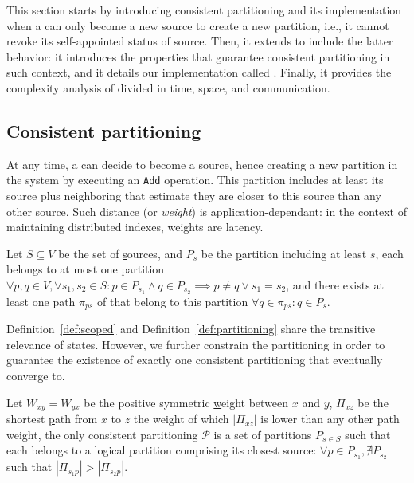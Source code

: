 \noindent This section starts by introducing consistent partitioning
and its implementation when a \process can only become a new source to
create a new partition, i.e., it cannot revoke its self-appointed
status of source. Then, it extends to include the latter behavior: it
introduces the properties that guarantee consistent partitioning in
such context, and it details our implementation called \NAME. Finally,
it provides the complexity analysis of \NAME divided in time, space,
and communication.


\subsection{Consistent partitioning}

At any time, a \process can decide to become a source, hence creating a
new partition in the system by executing an \texttt{Add}
operation. This partition includes at least its source plus
neighboring \processes that estimate they are closer to this source
than any other source. Such distance (or \emph{weight}) is
application-dependant: in the context of maintaining distributed
indexes, weights are latency.


\begin{definition}
  Let $S \subseteq V$ be the set of \underline{s}ources, and $P_s$ be
  the \underline{p}artition including at least \Process $s$, each
  \process belongs to at most one partition $\forall p,q \in V, \forall
  s_1,s_2 \in S: p \in P_{s_1} \wedge q \in P_{s_2} \implies p \neq q
  \vee s_1 = s_2$, and there exists at least one path $\pi_{ps}$ of
  \processes that belong to this partition $\forall q \in \pi_{ps}: q
  \in P_s$.
\end{definition}

Definition~\ref{def:scoped} and Definition~\ref{def:partitioning}
share the transitive relevance of \process states. However, we further
constrain the partitioning in order to guarantee the existence of
exactly one consistent partitioning that \processes eventually converge
to.

\begin{definition}
  Let $W_{xy} = W_{yx}$ be the positive symmetric \underline{w}eight
  between $x$ and $y$, $\Pi_{xz}$ be the shortest \underline{p}ath
  from $x$ to $z$ the weight of which $|\Pi_{xz}|$ is lower than any
  other path weight, the only consistent partitioning $\mathcal{P}$ is
  a set of partitions $P_{s\in S}$ such that each \process belongs to
  a logical partition comprising its closest source: $\forall p \in
  P_{s_1}, \nexists P_{s_2}$ such that $|\Pi_{s_1p}| > |\Pi_{s_2p}|$.
\end{definition}

